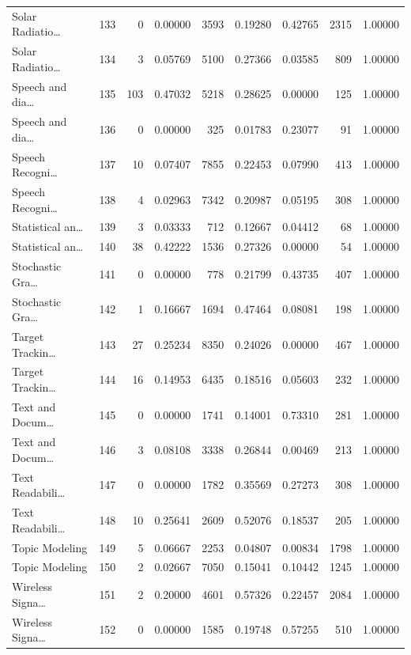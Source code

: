 \begin{table}
\begin{tabular}{lrrrrrrrr}
Solar Radiatio… & 133 & 0 & 0.00000 & 3593 & 0.19280 & 0.42765 & 2315 & 1.00000 \\
Solar Radiatio… & 134 & 3 & 0.05769 & 5100 & 0.27366 & 0.03585 & 809 & 1.00000 \\
Speech and dia… & 135 & 103 & 0.47032 & 5218 & 0.28625 & 0.00000 & 125 & 1.00000 \\
Speech and dia… & 136 & 0 & 0.00000 & 325 & 0.01783 & 0.23077 & 91 & 1.00000 \\
Speech Recogni… & 137 & 10 & 0.07407 & 7855 & 0.22453 & 0.07990 & 413 & 1.00000 \\
Speech Recogni… & 138 & 4 & 0.02963 & 7342 & 0.20987 & 0.05195 & 308 & 1.00000 \\
Statistical an… & 139 & 3 & 0.03333 & 712 & 0.12667 & 0.04412 & 68 & 1.00000 \\
Statistical an… & 140 & 38 & 0.42222 & 1536 & 0.27326 & 0.00000 & 54 & 1.00000 \\
Stochastic Gra… & 141 & 0 & 0.00000 & 778 & 0.21799 & 0.43735 & 407 & 1.00000 \\
Stochastic Gra… & 142 & 1 & 0.16667 & 1694 & 0.47464 & 0.08081 & 198 & 1.00000 \\
Target Trackin… & 143 & 27 & 0.25234 & 8350 & 0.24026 & 0.00000 & 467 & 1.00000 \\
Target Trackin… & 144 & 16 & 0.14953 & 6435 & 0.18516 & 0.05603 & 232 & 1.00000 \\
Text and Docum… & 145 & 0 & 0.00000 & 1741 & 0.14001 & 0.73310 & 281 & 1.00000 \\
Text and Docum… & 146 & 3 & 0.08108 & 3338 & 0.26844 & 0.00469 & 213 & 1.00000 \\
Text Readabili… & 147 & 0 & 0.00000 & 1782 & 0.35569 & 0.27273 & 308 & 1.00000 \\
Text Readabili… & 148 & 10 & 0.25641 & 2609 & 0.52076 & 0.18537 & 205 & 1.00000 \\
Topic Modeling & 149 & 5 & 0.06667 & 2253 & 0.04807 & 0.00834 & 1798 & 1.00000 \\
Topic Modeling & 150 & 2 & 0.02667 & 7050 & 0.15041 & 0.10442 & 1245 & 1.00000 \\
Wireless Signa… & 151 & 2 & 0.20000 & 4601 & 0.57326 & 0.22457 & 2084 & 1.00000 \\
Wireless Signa… & 152 & 0 & 0.00000 & 1585 & 0.19748 & 0.57255 & 510 & 1.00000 \\
\bottomrule
\end{tabular}
\end{table}
